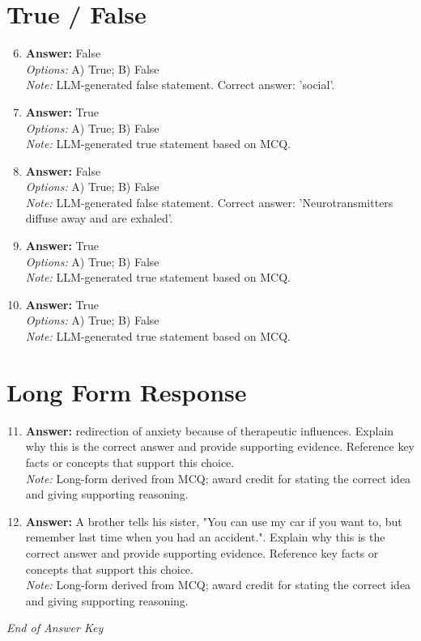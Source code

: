 \documentclass[12pt]{article}
\begin{document}
\section*{True / False}
\begin{enumerate}[label=\arabic*.]
\setcounter{enumi}{5}
\item \textbf{Answer:} False
\\ \textit{Options:} A) True; B) False
\\ \textit{Note:} LLM-generated false statement. Correct answer: 'social'.
\item \textbf{Answer:} True
\\ \textit{Options:} A) True; B) False
\\ \textit{Note:} LLM-generated true statement based on MCQ.
\item \textbf{Answer:} False
\\ \textit{Options:} A) True; B) False
\\ \textit{Note:} LLM-generated false statement. Correct answer: 'Neurotransmitters diffuse away and are exhaled'.
\item \textbf{Answer:} True
\\ \textit{Options:} A) True; B) False
\\ \textit{Note:} LLM-generated true statement based on MCQ.
\item \textbf{Answer:} True
\\ \textit{Options:} A) True; B) False
\\ \textit{Note:} LLM-generated true statement based on MCQ.
\end{enumerate}

\section*{Long Form Response}
\begin{enumerate}[label=\arabic*.]
\setcounter{enumi}{10}
\item \textbf{Answer:} redirection of anxiety because of therapeutic influences. Explain why this is the correct answer and provide supporting evidence. Reference key facts or concepts that support this choice.
\\ \textit{Note:} Long-form derived from MCQ; award credit for stating the correct idea and giving supporting reasoning.
\item \textbf{Answer:} A brother tells his sister, "You can use my car if you want to, but remember last time when you had an accident.". Explain why this is the correct answer and provide supporting evidence. Reference key facts or concepts that support this choice.
\\ \textit{Note:} Long-form derived from MCQ; award credit for stating the correct idea and giving supporting reasoning.
\end{enumerate}

\vfill
\noindent\textit{End of Answer Key}
\end{document}
